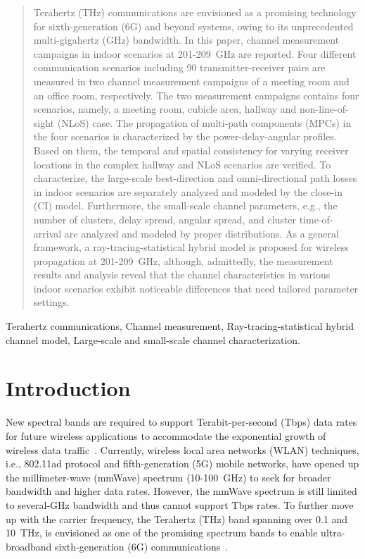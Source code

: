 \documentclass[journal,12pt,draftclsnofoot,onecolumn]{IEEEtran}
\begin{document}
\begin{abstract}
Terahertz (THz) communications are envisioned as a promising technology for sixth-generation (6G) and beyond systems, owing to its unprecedented multi-gigahertz (GHz) bandwidth. In this paper, channel measurement campaigns in indoor scenarios at 201-209~GHz are reported. Four different communication scenarios including 90 transmitter-receiver pairs are measured in two channel measurement campaigns of a meeting room and an office room, respectively. The two measurement campaigns contains four scenarios, namely, a meeting room, cubicle area, hallway and non-line-of-sight (NLoS) case. The propagation of multi-path components (MPCs) in the four scenarios is characterized by the power-delay-angular profiles. Based on them, the temporal and spatial consistency for varying receiver locations in the complex hallway and NLoS scenarios are verified. To characterize, the large-scale best-direction and omni-directional path losses in indoor scenarios are separately analyzed and modeled by the close-in (CI) model. Furthermore, the small-scale channel parameters, e.g., the number of clusters, delay spread, angular spread, and cluster time-of-arrival are analyzed and modeled by proper distributions. As a general framework, a ray-tracing-statistical hybrid model is proposed for wireless propagation at 201-209~GHz, although, admittedly, the measurement results and analysis reveal that the channel characteristics in various indoor scenarios exhibit noticeable differences that need tailored parameter settings.
\boldmath

\end{abstract}
\begin{IEEEkeywords}
 Terahertz communications, Channel measurement, Ray-tracing-statistical hybrid channel model, Large-scale and small-scale channel characterization.
\end{IEEEkeywords}
\section{Introduction}
New spectral bands are required to support Terabit-per-second (Tbps) data rates for future wireless applications to accommodate the exponential growth of wireless data traffic~\cite{chong2017thz,rappaport2019wireless,akyildiz2022terahertz }. Currently, wireless local area networks (WLAN) techniques, i.e., 802.11ad protocol and fifth-generation (5G) mobile networks, have opened up the millimeter-wave (mmWave) spectrum (10-100~GHz) to seek for broader bandwidth and higher data rates. However, the mmWave spectrum is still limited to several-GHz bandwidth and thus cannot support Tbps rates. To further move up with the carrier frequency, the Terahertz (THz) band spanning over 0.1 and 10~THz, is envisioned as one of the promising spectrum bands to enable ultra-broadband sixth-generation (6G) communications~\cite{wang20206G}.
\end{document}
